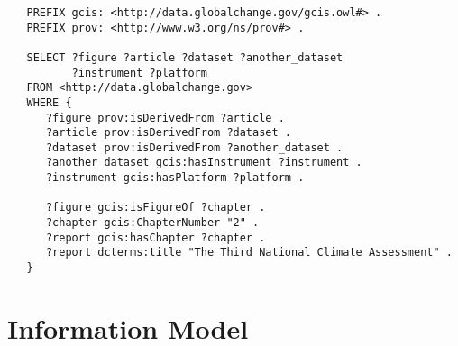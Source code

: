 \documentclass{beamer}
\begin{document}
\begin{frame}[fragile]
    \frametitle{\insertsubsectionhead}
\begin{small}
\begin{Verbatim}
   PREFIX gcis: <http://data.globalchange.gov/gcis.owl#> .
   PREFIX prov: <http://www.w3.org/ns/prov#> .

   SELECT ?figure ?article ?dataset ?another_dataset
          ?instrument ?platform
   FROM <http://data.globalchange.gov>
   WHERE {
      ?figure prov:isDerivedFrom ?article .
      ?article prov:isDerivedFrom ?dataset .
      ?dataset prov:isDerivedFrom ?another_dataset .
      ?another_dataset gcis:hasInstrument ?instrument .
      ?instrument gcis:hasPlatform ?platform .

      ?figure gcis:isFigureOf ?chapter .
      ?chapter gcis:ChapterNumber "2" .
      ?report gcis:hasChapter ?chapter .
      ?report dcterms:title "The Third National Climate Assessment" .
   }
\end{Verbatim}
\end{small}
\end{frame}


\section{Information Model}
\end{document}
